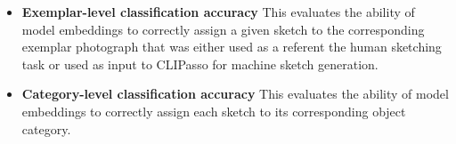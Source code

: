 \documentclass[10pt,letterpaper]{article}
\makeatletter
\newcommand{\hh}[1]{\textcolor{Blue}{@hh: #1}}
\newcommand{\cl}[1]{\textcolor{Green}{@cl: #1}}
\makeatother
\begin{document}
\begin{itemize}

    \item \textbf{Exemplar-level classification accuracy} This evaluates the ability of model embeddings to correctly assign a given sketch to the corresponding exemplar photograph that was either used as a referent the human sketching task or used as input to CLIPasso for machine sketch generation.
    \item \textbf{Category-level classification accuracy} This evaluates the ability of model embeddings to correctly assign each sketch to its corresponding object category. 
    
    

\end{itemize}
\end{document}
